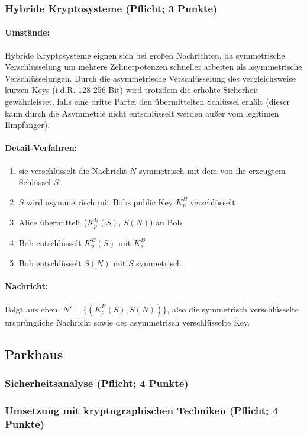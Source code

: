 \documentclass{article}
\begin{document}
\subsubsection{Hybride Kryptosysteme (Pflicht; 3 Punkte)}
\paragraph{Umstände:}
Hybride Kryptosysteme eignen sich bei großen Nachrichten, da symmetrische Verschlüsselung um mehrere Zehnerpotenzen schneller arbeiten als asymmetrische Verschlüsselungen.
Durch die asymmetrische Verschlüsselung des vergleichsweise kurzen Keys (i.d.R. 128-256 Bit) wird trotzdem die erhöhte Sicherheit gewährleistet, falls eine dritte Partei den übermittelten Schlüssel erhält (dieser kann durch die Asymmetrie nicht entschlüsselt werden außer vom legitimen Empfänger).
\paragraph{Detail-Verfahren:}
\begin{enumerate}
	\item sie verschlüsselt die Nachricht $N$ symmetrisch mit dem von ihr erzeugtem Schlüssel $S$
	\item $S$ wird asymmetrisch mit Bobs public Key $K_p^B$ verschlüsselt
	\item Alice übermittelt ($K_p^B(S)$, $S(N)$) an Bob
	\item Bob entschlüsselt $K_p^B(S)$ mit $K_s^B$
	\item Bob entschlüsselt $S(N)$ mit $S$ symmetrisch
\end{enumerate}
\paragraph{Nachricht:}
Folgt aus eben: $N' = \{(K_p^B(S),S(N))\}$, also die symmetrisch verschlüsselte ursprüngliche Nachricht sowie der asymmetrisch verschlüsselte Key.
\subsection{Parkhaus}
\subsubsection{Sicherheitsanalyse (Pflicht; 4 Punkte)}
\subsubsection{Umsetzung mit kryptographischen Techniken (Pflicht; 4 Punkte)}
\end{document}
